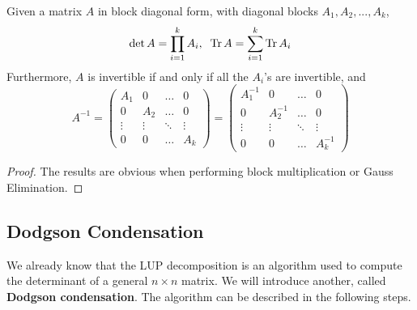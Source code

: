   \begin{theorem}
    Given a matrix $A$ in block diagonal form, with diagonal blocks $A_1, A_2, ..., A_k$,
    \begin{equation}
      \det{A} = \prod_{i=1}^k A_i, \; \; \Tr{A} = \sum_{i=1}^k \Tr{A_i}
    \end{equation}
    Furthermore, $A$ is invertible if and only if all the $A_i$'s are invertible, and 
    \begin{equation}
      A^{-1} = \begin{pmatrix}
      A_1&0&\ldots&0\\
      0&A_2&\ldots&0\\
      \vdots&\vdots&\ddots&\vdots\\
      0&0&\ldots&A_k
      \end{pmatrix} = \begin{pmatrix}
      A_1^{-1}&0&\ldots&0\\
      0&A_2^{-1}&\ldots&0\\
      \vdots&\vdots&\ddots&\vdots\\
      0&0&\ldots&A_k^{-1}
      \end{pmatrix}
    \end{equation}
  \end{theorem}
  \begin{proof}
    The results are obvious when performing block multiplication or Gauss Elimination. 
  \end{proof}

\subsection{Dodgson Condensation}

  We already know that the LUP decomposition is an algorithm used to compute the determinant of a general $n \times n$ matrix. We will introduce another, called \textbf{Dodgson condensation}. The algorithm can be described in the following steps.

